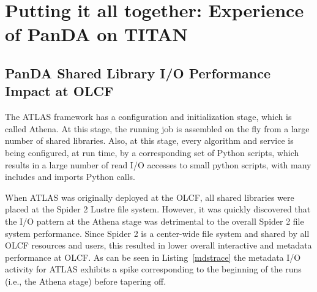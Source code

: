 \section{Putting it all together: Experience of PanDA on TITAN} %
\label{sec:panda_titan}

\subsection{PanDA Shared Library I/O Performance Impact at OLCF}


The ATLAS framework has a configuration and initialization stage, which is
called Athena. At this stage, the running job is assembled  on the fly from a
large number of shared libraries.  Also, at this stage, every algorithm and
service is being configured, at run time, by a corresponding set of Python
scripts, which results in a large number of read I/O accesses to small python
scripts, with many includes and imports Python calls.

When ATLAS was originally deployed at the OLCF, all shared libraries were
placed at the Spider 2 Lustre file system. However, it was quickly discovered
that the I/O pattern at the Athena stage was detrimental to the overall Spider
2 file system performance. Since Spider 2 is a center-wide file system and
shared by all OLCF resources and users, this resulted in lower overall
interactive and metadata performance at OLCF. As can be seen in
Listing~\ref{mdstrace} the metadata I/O activity for ATLAS exhibits a spike
corresponding to the beginning of the runs (i.e., the Athena stage) before
tapering off.

